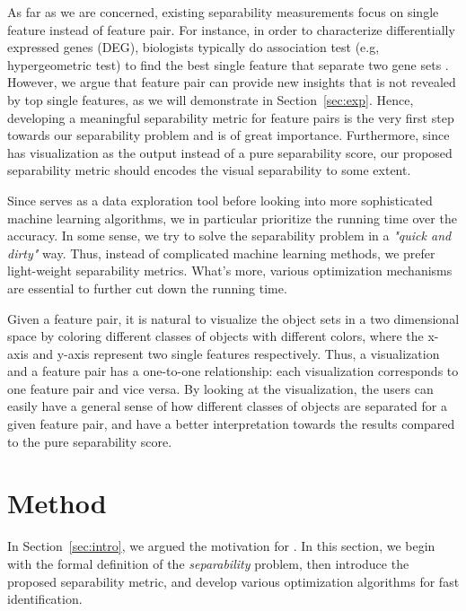  As far as we are concerned, existing separability measurements focus on single feature instead of feature pair. For instance, in order to characterize differentially expressed genes (DEG), biologists typically do association test (e.g, hypergeometric test) to find the best single feature that separate two gene sets . However, we argue that feature pair can provide new insights that is not revealed by top single features, as we will demonstrate in Section~\ref{sec:exp}. Hence, developing a meaningful separability metric for feature pairs is the very first step towards our separability problem and is of great importance. Furthermore, since \genviz has visualization as the output instead of a pure separability score, our proposed separability metric should encodes the visual separability to some extent. 

 Since \genviz serves as a data exploration tool before looking into more sophisticated machine learning algorithms, we in particular prioritize the running time over the accuracy. In some sense, we try to solve the separability problem in a {\em "quick and dirty"} way. Thus, instead of complicated machine learning methods, we prefer light-weight separability metrics. What's more, various optimization mechanisms are essential to further cut down the running time. 


 Given a feature pair, it is natural to visualize the object sets in a two dimensional space by coloring different classes of objects with different colors, where the x-axis and y-axis represent two single features respectively. Thus, a visualization and a feature pair has a one-to-one relationship: each visualization corresponds to one feature pair and vice versa. By looking at the visualization, the users can easily have a general sense of how different classes of objects are separated for a given feature pair, and have a better interpretation towards the results compared to the pure separability score.




















\section{Method}
\label{sec:method}
In Section~\ref{sec:intro}, we argued the motivation for \genviz. In this section, we begin with the formal definition of the {\em separability} problem, then introduce the proposed separability metric, and develop various optimization algorithms for fast identification.
